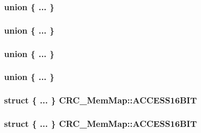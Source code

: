 \subsubsection[{\texorpdfstring{"@9}{@9}}]{\setlength{\rightskip}{0pt plus 5cm}union \{ ... \} }\hypertarget{struct_c_r_c___mem_map_adbb88eb809ff24bfff6c3b11f11e03fd}{}\label{struct_c_r_c___mem_map_adbb88eb809ff24bfff6c3b11f11e03fd}
\subsubsection[{\texorpdfstring{"@95}{@95}}]{\setlength{\rightskip}{0pt plus 5cm}union \{ ... \} }\hypertarget{struct_c_r_c___mem_map_acbfbe21af085eb6c3976b5e25da1a950}{}\label{struct_c_r_c___mem_map_acbfbe21af085eb6c3976b5e25da1a950}
\subsubsection[{\texorpdfstring{"@97}{@97}}]{\setlength{\rightskip}{0pt plus 5cm}union \{ ... \} }\hypertarget{struct_c_r_c___mem_map_a2acef452dad5cfb585da5d8de84a2cb4}{}\label{struct_c_r_c___mem_map_a2acef452dad5cfb585da5d8de84a2cb4}
\subsubsection[{\texorpdfstring{"@99}{@99}}]{\setlength{\rightskip}{0pt plus 5cm}union \{ ... \} }\hypertarget{struct_c_r_c___mem_map_a1fd064c5ef598b5a4837ddc911e7a438}{}\label{struct_c_r_c___mem_map_a1fd064c5ef598b5a4837ddc911e7a438}
\subsubsection[{\texorpdfstring{A\+C\+C\+E\+S\+S16\+B\+IT}{ACCESS16BIT}}]{\setlength{\rightskip}{0pt plus 5cm}struct \{ ... \}   C\+R\+C\+\_\+\+Mem\+Map\+::\+A\+C\+C\+E\+S\+S16\+B\+IT}\hypertarget{struct_c_r_c___mem_map_a4a712a3dc1314ba53a55654087e76df6}{}\label{struct_c_r_c___mem_map_a4a712a3dc1314ba53a55654087e76df6}
\subsubsection[{\texorpdfstring{A\+C\+C\+E\+S\+S16\+B\+IT}{ACCESS16BIT}}]{\setlength{\rightskip}{0pt plus 5cm}struct \{ ... \}   C\+R\+C\+\_\+\+Mem\+Map\+::\+A\+C\+C\+E\+S\+S16\+B\+IT}\hypertarget{struct_c_r_c___mem_map_a080cd68f01b837a502aad19a1eb68ea9}{}\label{struct_c_r_c___mem_map_a080cd68f01b837a502aad19a1eb68ea9}
